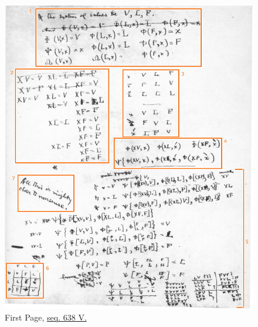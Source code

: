\begin{figure}
    \centering
    \includegraphics[width=\textwidth]{images/page one.jpeg}
    \caption{First Page, \href{https://iiif.lib.harvard.edu/manifests/view/drs:15255301$638i}{seq. 638 V.}}
    \label{fig:seq638}
\end{figure}



